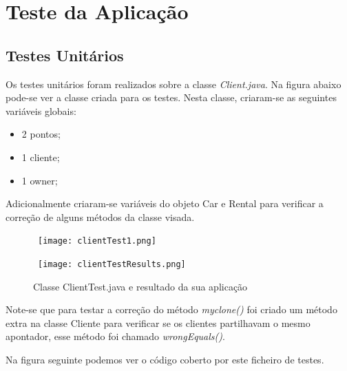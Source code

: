 \section{Teste da Aplicação}

\subsection{Testes Unitários}

\par Os testes unitários foram realizados sobre a classe \textit{Client.java}.
Na figura abaixo pode-se ver a classe criada para os testes.\newline
Nesta classe, criaram-se as seguintes variáveis globais:
\begin{itemize}
\item 2 pontos;
\item 1 cliente;
\item 1 owner;
\end{itemize}

\par Adicionalmente criaram-se variáveis do objeto Car e Rental para verificar a correção de alguns métodos da classe visada.

\begin{figure}[H]

  \centering

  \hbox{\hspace{-6em} \texttt{[image: clientTest1.png]}}

\end{figure}

\begin{figure}[H]

  \centering

  \hbox{\hspace{-8em} \texttt{[image: clientTestResults.png]}}

  \caption {Classe ClientTest.java e resultado da sua aplicação}

  \label {fig30}

\end{figure}
\par Note-se que para testar a correção do método \textit{myclone()} foi criado um método extra na classe Cliente para verificar se os clientes partilhavam o mesmo apontador, esse método foi chamado \textit{wrongEquals()}.

\par Na figura seguinte podemos ver o código coberto por este ficheiro de testes.\newline

